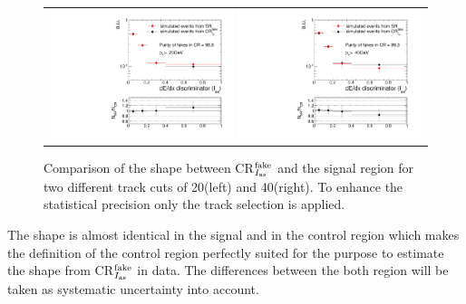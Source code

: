 \begin{figure}[!b]
\vspace{20pt}
  \centering 
  \begin{tabular}{c}
    \includegraphics[width=0.49\textwidth]{figures/analysis/Background/hASmi_SRbinning_d0Inverted_fakes_ECalaoLe5_trackPtGt20_MC_CR_MC_SR.pdf}
    \includegraphics[width=0.49\textwidth]{figures/analysis/Background/hASmi_SRbinning_d0Inverted_fakes_ECalaoLe5_trackPtGt40_MC_CR_MC_SR.pdf}
  \end{tabular}
  \caption{Comparison of the \ias shape between CR$_{I_{\text{as}}}^{\text{fake}}$ and the signal region for two different track \pt cuts of 20\gev (left) and 40\gev (right). To enhance the statistical precision only the track selection is applied.}
  \label{fig:IasSRCRFakes}
\end{figure}

The \ias shape is almost identical in the signal and in the control region which makes the definition of the control region perfectly suited for the purpose to estimate the \ias shape from CR$_{I_{\text{as}}}^{\text{fake}}$ in data.
The differences between the both region will be taken as systematic uncertainty into account.

